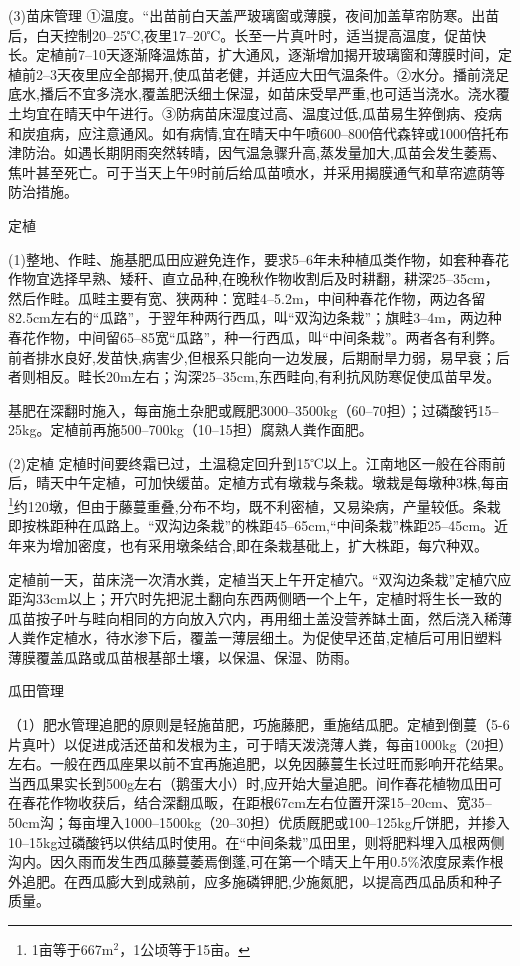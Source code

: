 \documentclass{ctexbook}
\begin{document}
(3)苗床管理
①温度。“出苗前白天盖严玻璃窗或薄膜，夜间加盖草帘防寒。出苗后，白天控制20--25℃,夜里17--20℃。长至一片真叶时，适当提高温度，促苗快长。定植前7--10天逐渐降温炼苗，扩大通风，逐渐增加揭开玻璃窗和薄膜时间，定植前2--3天夜里应全部揭开,使瓜苗老健，并适应大田气温条件。②水分。播前浇足底水,播后不宜多浇水,覆盖肥沃细土保湿，如苗床受旱严重,也可适当浇水。浇水覆土均宜在晴天中午进行。③防病苗床湿度过高、温度过低,瓜苗易生猝倒病、疫病和炭疽病，应注意通风。如有病情,宜在晴天中午喷600--800倍代森锌或1000倍托布津防治。如遇长期阴雨突然转晴，因气温急骤升高,蒸发量加大,瓜苗会发生萎焉、焦叶甚至死亡。可于当天上午9时前后给瓜苗喷水，并采用揭膜通气和草帘遮荫等防治措施。

定植 

(1)整地、作畦、施基肥瓜田应避免连作，要求5--6年未种植瓜类作物，如套种春花作物宜选择早熟、矮秆、直立品种,在晚秋作物收割后及时耕翻，耕深25--35cm，然后作畦。瓜畦主要有宽、狭两种：宽畦4--5.2m，中间种春花作物，两边各留82.5cm左右的“瓜路”，于翌年种两行西瓜，叫“双沟边条栽”；旗畦3--4m，两边种春花作物，中间留65--85宽“瓜路”，种一行西瓜，叫“中间条栽”。两者各有利弊。前者排水良好,发苗快,病害少,但根系只能向一边发展，后期耐旱力弱，易早衰；后者则相反。畦长20m左右；沟深25--35cm,东西畦向,有利抗风防寒促使瓜苗早发。

基肥在深翻时施入，每亩施土杂肥或厩肥3000--3500kg（60--70担）；过磷酸钙15--25kg。定植前再施500--700kg（10--15担）腐熟人粪作面肥。

(2)定植 定植时间要终霜已过，土温稳定回升到15℃以上。江南地区一般在谷雨前后，晴天中午定植，可加快缓苗。定植方式有墩栽与条栽。墩栽是每墩种3株,每亩\footnote{1亩等于667m$^2$，1公顷等于15亩。}约120墩，但由于藤蔓重叠,分布不均，既不利密植，又易染病，产量较低。条栽即按株距种在瓜路上。“双沟边条栽”的株距45--65cm,“中间条栽”株距25--45cm。近年来为增加密度，也有采用墩条结合,即在条栽基砒上，扩大株距，每穴种双。

定植前一天，苗床浇一次清水粪，定植当天上午开定植穴。“双沟边条栽”定植穴应距沟33cm以上；开穴时先把泥土翻向东西两侧晒一个上午，定植时将生长一致的瓜苗按子叶与畦向相同的方向放入穴内，再用细土盖没营养缽土面，然后浇入稀薄人粪作定植水，待水渗下后，覆盖一薄层细土。为促使早还苗,定植后可用旧塑料薄膜覆盖瓜路或瓜苗根基部土壤，以保温、保湿、防雨。

瓜田管理

（1）肥水管理追肥的原则是轻施苗肥，巧施藤肥，重施结瓜肥。定植到倒蔓（5-6片真叶）以促进成活还苗和发根为主，可于晴天泼浇薄人粪，每亩1000kg（20担）左右。一般在西瓜座果以前不宜再施追肥，以免因藤蔓生长过旺而影响开花结果。当西瓜果实长到500g左右（鹅蛋大小）时,应开始大量追肥。间作春花植物瓜田可在春花作物收获后，结合深翻瓜畈，在距根67cm左右位置开深15--20cm、宽35--50cm沟；每亩埋入1000--1500kg（20--30担）优质厩肥或100--125kg斤饼肥，并掺入10--15kg过磷酸钙以供结瓜时使用。在“中间条栽”瓜田里，则将肥料埋入瓜根两侧沟内。因久雨而发生西瓜藤蔓萎焉倒蓬,可在第一个晴天上午用0.5\%浓度尿素作根外追肥。在西瓜膨大到成熟前，应多施磷钾肥,少施氮肥，以提高西瓜品质和种子质量。
\end{document}
